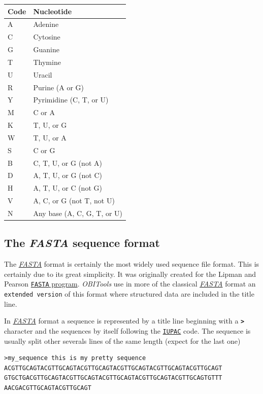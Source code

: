 \documentclass[
  letterpaper,
  DIV=11,
  numbers=noendperiod]{scrreprt}
\begin{document}
\begin{longtable}[]{@{}ll@{}}
\toprule()
\textbf{Code} & \textbf{Nucleotide} \\
\midrule()
\endhead
A & Adenine \\
C & Cytosine \\
G & Guanine \\
T & Thymine \\
U & Uracil \\
R & Purine (A or G) \\
Y & Pyrimidine (C, T, or U) \\
M & C or A \\
K & T, U, or G \\
W & T, U, or A \\
S & C or G \\
B & C, T, U, or G (not A) \\
D & A, T, U, or G (not C) \\
H & A, T, U, or C (not G) \\
V & A, C, or G (not T, not U) \\
N & Any base (A, C, G, T, or U) \\
\bottomrule()
\end{longtable}

\hypertarget{sec-fasta}{%
\subsection{\texorpdfstring{The \emph{FASTA} sequence
format}{The FASTA sequence format}}\label{sec-fasta}}

The \protect\hyperlink{sec-fasta}{\emph{FASTA}} format is certainly the
most widely used sequence file format. This is certainly due to its
great simplicity. It was originally created for the Lipman and Pearson
\href{http://www.ncbi.nlm.nih.gov/pubmed/3162770?dopt=Citation}{\texttt{FASTA}
program}. \emph{OBITools} use in more of the classical
\protect\hyperlink{sec-fasta}{\emph{FASTA}} format an
\texttt{extended\ version} of this format where structured data are
included in the title line.

In \protect\hyperlink{sec-fasta}{\emph{FASTA}} format a sequence is
represented by a title line beginning with a
\textbf{\texttt{\textgreater{}}} character and the sequences by itself
following the \protect\hyperlink{sec-iupac}{\texttt{IUPAC}} code. The
sequence is usually split other severals lines of the same length
(expect for the last one)

\begin{verbatim}
>my_sequence this is my pretty sequence
ACGTTGCAGTACGTTGCAGTACGTTGCAGTACGTTGCAGTACGTTGCAGTACGTTGCAGT
GTGCTGACGTTGCAGTACGTTGCAGTACGTTGCAGTACGTTGCAGTACGTTGCAGTGTTT
AACGACGTTGCAGTACGTTGCAGT
\end{verbatim}
\end{document}
